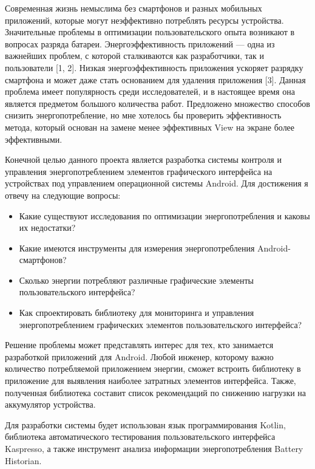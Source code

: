 

Современная жизнь немыслима без смартфонов и разных мобильных приложений, которые могут неэффективно потреблять ресурсы устройства. Значительные проблемы в оптимизации пользовательского опыта возникают в вопросах разряда батареи. Энергоэффективность приложений --- одна из важнейших проблем, с которой сталкиваются как разработчики, так и пользователи [1, 2]. Низкая энергоэффективность приложения ускоряет разрядку смартфона и может даже стать основанием для удаления приложения [3]. Данная проблема имеет популярность среди исследователей, и в настоящее время она является предметом большого количества работ. Предложено множество способов снизить энергопотребление, но мне хотелось бы проверить эффективность метода, который основан на замене менее эффективных View на экране более эффективными.

Конечной целью данного проекта является разработка системы контроля и управления энергопотреблением элементов графического интерфейса на устройствах под управлением операционной системы Android. Для достижения я отвечу на следующие вопросы:
\begin{itemize}
	\item Какие существуют исследования по оптимизации энергопотребления и каковы их недостатки?
	\item Какие имеются инструменты для измерения энергопотребления Android-смартфонов?
	\item Сколько энергии потребляют различные графические элементы пользовательского интерфейса?
	\item Как спроектировать библиотеку для мониторинга и управления энергопотреблением графических элементов пользовательского интерфейса?
\end{itemize}

Решение проблемы может представлять интерес для тех, кто занимается разработкой приложений для Android. Любой инженер, которому важно количество потребляемой приложением энергии, сможет встроить библиотеку в приложение для выявления наиболее затратных элементов интерфейса. Также, полученная библиотека составит список рекомендаций по снижению нагрузки на аккумулятор устройства.

Для разработки системы будет использован язык программирования Kotlin, библиотека автоматического тестирования пользовательского интерфейса Kaspresso, а также инструмент анализа информации энергопотребления Battery Historian.

